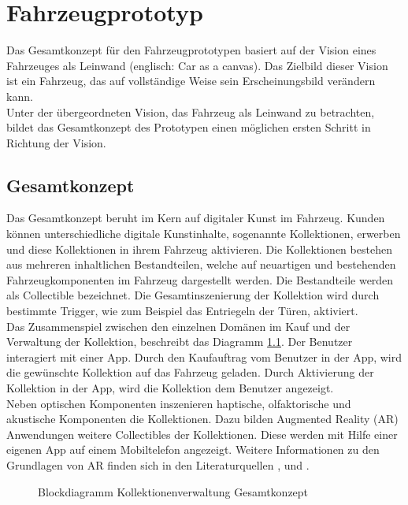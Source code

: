 \chapter{Fahrzeugprototyp}
\label{cha:Prototyp}
Das Gesamtkonzept für den Fahrzeugprototypen basiert auf der Vision eines \glqq Fahrzeuges als Leinwand\grqq{} (englisch: \glqq Car as a canvas\grqq{}). Das Zielbild dieser Vision ist ein Fahrzeug, das auf vollständige Weise sein Erscheinungsbild verändern kann. \\
Unter der übergeordneten Vision, das Fahrzeug als Leinwand zu betrachten, bildet das Gesamtkonzept des Prototypen einen möglichen ersten Schritt in Richtung der Vision.
\section{Gesamtkonzept}
Das Gesamtkonzept beruht im Kern auf digitaler Kunst im Fahrzeug. Kunden können unterschiedliche digitale Kunstinhalte, sogenannte Kollektionen, erwerben und diese Kollektionen in ihrem Fahrzeug aktivieren. Die Kollektionen bestehen aus mehreren inhaltlichen Bestandteilen, welche auf neuartigen und bestehenden Fahrzeugkomponenten im Fahrzeug dargestellt werden. Die Bestandteile werden als \glqq Collectible\grqq{} bezeichnet. Die Gesamtinszenierung der Kollektion wird durch bestimmte Trigger, wie zum Beispiel das Entriegeln der Türen, aktiviert. \\
Das Zusammenspiel zwischen den einzelnen Domänen im Kauf und der Verwaltung der Kollektion, beschreibt das Diagramm \ref{fig:gesamtkonzept}. Der Benutzer interagiert mit einer App. Durch den Kaufauftrag vom Benutzer in der App, wird die gewünschte Kollektion auf das Fahrzeug geladen. Durch Aktivierung der Kollektion in der App, wird die Kollektion dem Benutzer angezeigt. \\
Neben optischen Komponenten inszenieren haptische, olfaktorische und akustische Komponenten die Kollektionen. Dazu bilden Augmented Reality (AR) Anwendungen weitere Collectibles der Kollektionen. Diese werden mit Hilfe einer eigenen App auf einem Mobiltelefon angezeigt. Weitere Informationen zu den Grundlagen von AR finden sich in den Literaturquellen \cite{Dorner.2019}, \cite{Grasnick.2020} und \cite{Hassanien.2022}. \\
\begin{figure}[]
	\centering
	
	\caption[Blockdiagramm Kollektionenverwaltung Gesamtkonzept]{Blockdiagramm Kollektionenverwaltung Gesamtkonzept}
	\label{fig:gesamtkonzept}
\end{figure}

